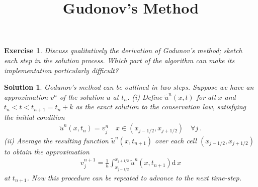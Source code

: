 \documentclass[10pt,letterpaper]{article}
\newcommand{\dif}[1][]{\mathrm{d} {#1}\,}
\newcommand{\frb}[1]{ \left(  {#1} \right) }
\theoremstyle{break}
\newtheorem{exercise}{Exercise}
\newtheorem{mysolution}{Solution}
\newenvironment{solution}{\begin{mysolution}}{\end{mysolution}}
\begin{document}
\title{Gudonov's Method}
\date{}

\maketitle








\begin{exercise}
    Discuss qualitatively the derivation of \emph{Godunov's method}; sketch each step in the solution process.
    Which part of the algorithm can make its implementation particularly difficult?
\end{exercise}



\begin{solution}
    Godunov's method can be outlined in two steps.
    Suppose we have an approximation $v^n$ of the solution $u$ at $t_n$.
    (i) Define $\widetilde{u}^{n}(x,t)$ for all $x$ and $t_n<t<t_{n+1}=t_n+k$ as the exact solution to the conservation law, satisfying the initial condition
    \begin{gather} \label{GodIn}
        \widetilde u^n\frb{x,t_n}=v^n_j
        \quad
        x\in(x_{j-1/2},x_{j+1/2})
        \quad\forall j\ .
    \end{gather}
    (ii) Average the resulting function $\widetilde{u}^{n}\frb{x,t_{n+1}}$ over each cell $(x_{j-1/2},x_{j+1/2})$ to obtain the approximation
    \begin{gather} \label{GogAvg}
        v_{j}^{n+1}=\frac{1}{h}\int_{x_{j-1/2}}^{x_{j+1/2}}\tilde{u}^{n}\frb{x,t_{n+1}}\dif x
    \end{gather}
    at $t_{n+1}$.
    Now this procedure can be repeated to advance to the next time-step.


\end{solution}
\end{document}
